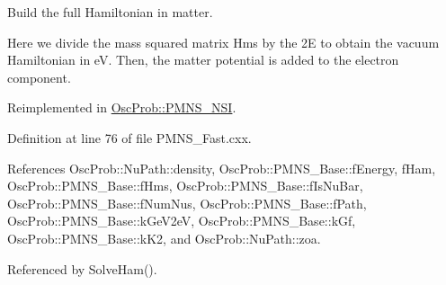 Build the full Hamiltonian in matter.

Here we divide the mass squared matrix Hms by the 2E to obtain the vacuum Hamiltonian in eV. Then, the matter potential is added to the electron component. 

Reimplemented in \hyperlink{classOscProb_1_1PMNS__NSI_ab5c4f4644fbedb8835f6336c553805ce}{Osc\+Prob\+::\+P\+M\+N\+S\+\_\+\+N\+SI}.



Definition at line 76 of file P\+M\+N\+S\+\_\+\+Fast.\+cxx.



References Osc\+Prob\+::\+Nu\+Path\+::density, Osc\+Prob\+::\+P\+M\+N\+S\+\_\+\+Base\+::f\+Energy, f\+Ham, Osc\+Prob\+::\+P\+M\+N\+S\+\_\+\+Base\+::f\+Hms, Osc\+Prob\+::\+P\+M\+N\+S\+\_\+\+Base\+::f\+Is\+Nu\+Bar, Osc\+Prob\+::\+P\+M\+N\+S\+\_\+\+Base\+::f\+Num\+Nus, Osc\+Prob\+::\+P\+M\+N\+S\+\_\+\+Base\+::f\+Path, Osc\+Prob\+::\+P\+M\+N\+S\+\_\+\+Base\+::k\+Ge\+V2eV, Osc\+Prob\+::\+P\+M\+N\+S\+\_\+\+Base\+::k\+Gf, Osc\+Prob\+::\+P\+M\+N\+S\+\_\+\+Base\+::k\+K2, and Osc\+Prob\+::\+Nu\+Path\+::zoa.



Referenced by Solve\+Ham().


